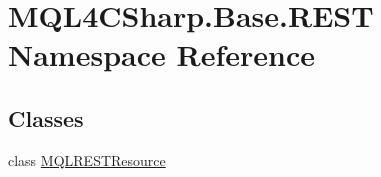 \hypertarget{namespace_m_q_l4_c_sharp_1_1_base_1_1_r_e_s_t}{}\section{M\+Q\+L4\+C\+Sharp.\+Base.\+R\+E\+ST Namespace Reference}
\label{namespace_m_q_l4_c_sharp_1_1_base_1_1_r_e_s_t}
\subsection*{Classes}
\begin{DoxyCompactItemize}
\item 
class \hyperlink{class_m_q_l4_c_sharp_1_1_base_1_1_r_e_s_t_1_1_m_q_l_r_e_s_t_resource}{M\+Q\+L\+R\+E\+S\+T\+Resource}
\end{DoxyCompactItemize}
